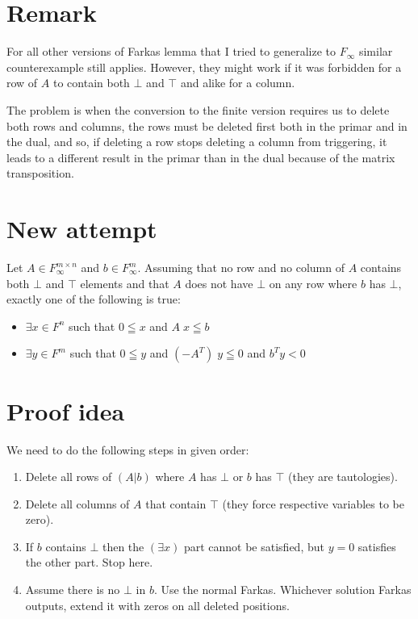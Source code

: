 \documentclass[]{article}
\begin{document}
\section{Remark}

For all other versions of Farkas lemma
that I tried to generalize to $F_\infty$
similar counterexample still applies.
However, they might work if it was forbidden
for a row of $A$ to contain both $\bot$ and $\top$
and alike for a column.

The problem is when the conversion to the finite
version requires us to delete both rows and columns,
the rows must be deleted first both in the primar
and in the dual, and so, if deleting a row stops
deleting a column from triggering, it leads to a
different result in the primar than in the dual
because of the matrix transposition.

\section{New attempt}

Let $A \in F_\infty^{m \times n}$ and $b \in F_\infty^m$.
Assuming that no row and no column of $A$ contains
both $\bot$ and $\top$ elements and that
$A$ does not have $\bot$ on any row where $b$ has $\bot$,
exactly one of the following is true:
\begin{itemize}
	\item $\exists x \in F^n$ such that
	$0 \leqq x$ and $A\; x \leqq b$
	\item $\exists y \in F^m$ such that
	$0 \leqq y$ and $(-A^T)\; y \leqq 0$ and $b^T y < 0$
\end{itemize}

\section{Proof idea}

We need to do the following steps in given order:
\begin{enumerate}
\item Delete all rows of $(A|b)$ where $A$ has $\bot$ or $b$ has $\top$
(they are tautologies).
\item Delete all columns of $A$ that contain $\top$
(they force respective variables to be zero).
\item If $b$ contains $\bot$ then the $(\exists x)$ part cannot be satisfied,
but $y = 0$ satisfies the other part. Stop here.
\item Assume there is no $\bot$ in $b$. Use the normal Farkas.
Whichever solution Farkas outputs, extend it with zeros on
all deleted positions.
\end{enumerate}
\end{document}
